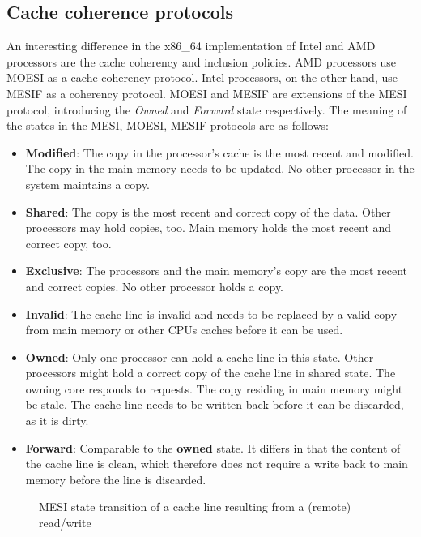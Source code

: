 \subsection{Cache coherence protocols}
\label{sec:state:technical:caches_protocol}
An interesting difference in the x86\_64 implementation of Intel and AMD
processors are the cache coherency and inclusion policies. AMD processors use
MOESI as a cache coherency protocol.\cite{amd_manual} Intel processors, on the
other hand, use MESIF as a coherency protocol.\cite{thomadakis2011architecture}
MOESI and MESIF are extensions of the MESI protocol, introducing the
\textit{Owned} and \textit{Forward} state respectively. The meaning of the
states in the MESI, MOESI, MESIF protocols are as follows:
\begin{itemize}
  \item \textbf{Modified}: The copy in the processor's cache is the most
    recent and modified. The copy in the main memory needs to be updated.
    No other processor in the system maintains a copy.
  \item \textbf{Shared}:  The copy is the most recent and correct copy of the
    data. Other processors may hold copies, too. Main memory holds the
    most recent and correct copy, too.
  \item \textbf{Exclusive}: The processors and the main memory's copy are the
    most recent and correct copies. No other processor holds a copy.
  \item \textbf{Invalid}: The cache line is invalid and needs to be replaced by
    a valid copy from main memory or other CPUs caches before it can be used.
  \item \textbf{Owned}: Only one processor can hold a cache line in this state.
    Other processors might hold a correct copy of the cache line in shared
    state. The owning core responds to requests. The copy residing in main
    memory might be stale. The cache line needs to be written back before it can
    be discarded, as it is dirty.
  \item \textbf{Forward}: Comparable to the \textbf{owned} state. It differs in
    that the content of the cache line is clean, which therefore does not
    require a write back to main memory before the line is discarded.
\end{itemize}

\begin{figure}
  \begin{center}
    
    \caption{MESI state transition of a cache line resulting from a (remote) read/write}
    \label{fig:state:technical:mesi}
  \end{center}
\end{figure}

